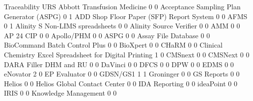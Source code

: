 \documentclass{article}
\begin{document}
\begin{Schunk}
\begin{Soutput}
                                                            Traceability URS
  Abbott Transfusion Medicine                                          0   0
  Acceptance Sampling Plan Generator (ASPG)                            0   1
  ADD Shop Floor Paper (SFP) Report System                             0   0
  AFMS                                                                 0   1
  Alinity S Non-LIMS spreadsheets                                      0   0
  Alinity Source Verifier                                              0   0
  AMM                                                                  0   0
  AP 24 CIP                                                            0   0
  Apollo/PHM                                                           0   0
  ASPG                                                                 0   0
  Assay File Database                                                  0   0
  BioCommand Batch Control Plus                                        0   0
  BioXpert                                                             0   0
  CHaRM                                                                0   0
  Clinical Chemistry Excel Spreadsheet for Digital Printing            1   0
  CMSnext                                                              0   0
  CMSNext                                                              0   0
  DARA Filler DHM and RU                                               0   0
  DaVinci                                                              0   0
  DFCS                                                                 0   0
  DPW                                                                  0   0
  EDMS                                                                 0   0
  eNovator                                                             2   0
  EP Evaluator                                                         0   0
  GDSN/GS1                                                             1   1
  Groninger                                                            0   0
  GS Reports                                                           0   0
  Helios                                                               0   0
  Helios Global Contact Center                                         0   0
  IDA Reporting                                                        0   0
  ideaPoint                                                            0   0
  IRIS                                                                 0   0
  Knowledge Management                                                 0   0

\end{Soutput}
\end{Schunk}
\end{document}

